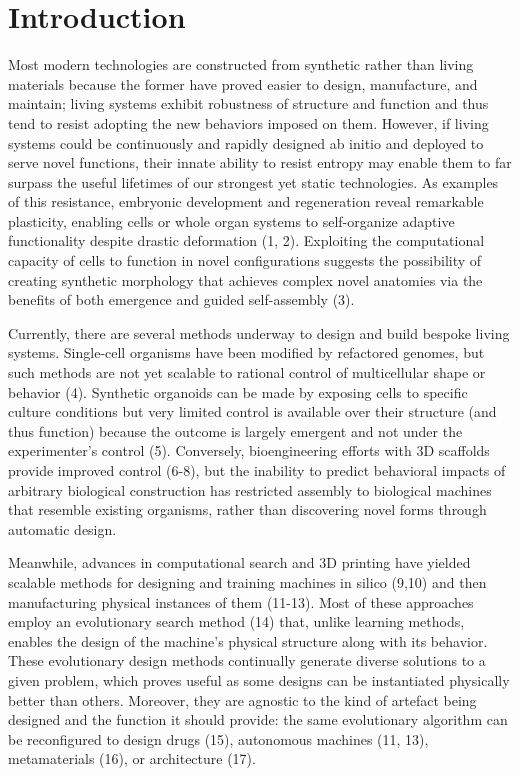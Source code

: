 \section{Introduction}

Most modern technologies are constructed from synthetic rather than living materials because the former have proved easier to design, manufacture, and maintain; living systems exhibit robustness of structure and function and thus tend to resist adopting the new behaviors imposed on them. However, if living systems could be continuously and rapidly designed ab initio and deployed to serve novel functions, their innate ability to resist entropy may enable them to far surpass the useful lifetimes of our strongest yet static technologies. As examples of this resistance, embryonic development and regeneration reveal remarkable plasticity, enabling cells or whole organ systems to self-organize adaptive functionality despite drastic deformation (1, 2). Exploiting the computational capacity of cells to function in novel configurations suggests the possibility of creating synthetic morphology that achieves complex novel anatomies via the benefits of both emergence and guided self-assembly (3).

Currently, there are several methods underway to design and build bespoke living systems. Single-cell organisms have been modified by refactored genomes, but such methods are not yet scalable to rational control of multicellular shape or behavior (4). Synthetic organoids can be made by exposing cells to specific culture conditions but very limited control is available over their structure (and thus function) because the outcome is largely emergent and not under the experimenter's control (5). Conversely, bioengineering efforts with 3D scaffolds provide improved control (6-8), but the inability to predict behavioral impacts of arbitrary biological construction has restricted assembly to biological machines that resemble existing organisms, rather than discovering novel forms through automatic design.

Meanwhile, advances in computational search and 3D printing have yielded scalable methods for designing and training machines in silico (9,10) and then manufacturing physical instances of them (11-13). Most of these approaches employ an evolutionary search method (14) that, unlike learning methods, enables the design of the machine's physical structure along with its behavior. These evolutionary design methods continually generate diverse solutions to a given problem, which proves useful as some designs can be instantiated physically better than others. Moreover, they are agnostic to the kind of artefact being designed and the function it should provide: the same evolutionary algorithm can be reconfigured to design drugs (15), autonomous machines (11, 13), metamaterials (16), or architecture (17). 

